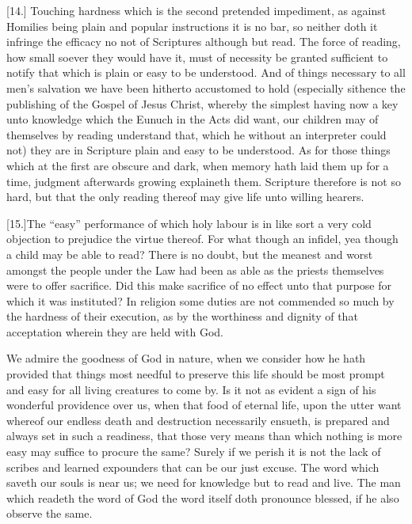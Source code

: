 [14.] Touching hardness which is the second pretended impediment, as against Homilies being plain and popular instructions it is no bar, so neither doth it infringe the efficacy no not of Scriptures although but read. The force of reading, how small soever they would have it, must of necessity be granted sufficient to notify that which is plain or easy to be understood. And of things necessary to all men’s salvation we have been hitherto accustomed to hold (especially sithence the publishing of the Gospel of Jesus Christ, whereby the simplest having now a key unto knowledge which the Eunuch in the Acts did want, our children may of themselves  by reading understand that, which he without an interpreter could not) they are in Scripture plain and easy to be understood.
 As for those things which at the first are obscure and dark, when memory hath laid them up for a time, judgment afterwards growing explaineth them. Scripture therefore is not so hard, but that the only reading thereof may give life unto willing hearers.

[15.]The “easy” performance of which holy labour is in like sort a very cold objection to prejudice the virtue thereof. For what though an infidel, yea though a child may be able to read? There is no doubt, but the meanest and worst amongst the people under the Law had been as able as the priests themselves were to offer sacrifice. Did this make sacrifice of no effect unto that purpose for which it was instituted? In religion some duties are not commended so much by the hardness of their execution, as by the worthiness and dignity of that acceptation wherein they are held with God.

We admire the goodness of God in nature, when we consider how he hath provided that things most needful to preserve this life should be most prompt and easy for all living creatures to come by. Is it not as evident a sign of his wonderful providence over us, when that food of eternal life, upon the utter want whereof our endless death and destruction necessarily ensueth, is prepared and always set in such a readiness, that those very means than which nothing is more easy may suffice to procure the same? Surely if we perish it is not the lack of scribes and learned expounders that can be our just excuse. The word which saveth our souls is near us; we need for knowledge but to read and live. The man which readeth the word of God the word itself doth pronounce blessed, if he also observe the same.


